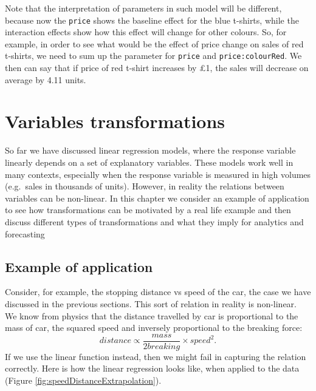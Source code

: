 \documentclass[
]{book}
\theoremstyle{definition}
\theoremstyle{definition}
\theoremstyle{definition}
\theoremstyle{definition}
\theoremstyle{remark}
\begin{document}
Note that the interpretation of parameters in such model will be different, because now the \texttt{price} shows the baseline effect for the blue t-shirts, while the interaction effects show how this effect will change for other colours. So, for example, in order to see what would be the effect of price change on sales of red t-shirts, we need to sum up the parameter for \texttt{price} and \texttt{price:colourRed}. We then can say that if price of red t-shirt increases by £1, the sales will decrease on average by 4.11 units.

\chapter{Variables transformations}\label{variablesTransformations}

So far we have discussed linear regression models, where the response variable linearly depends on a set of explanatory variables. These models work well in many contexts, especially when the response variable is measured in high volumes (e.g.~sales in thousands of units). However, in reality the relations between variables can be non-linear. In this chapter we consider an example of application to see how transformations can be motivated by a real life example and then discuss different types of transformations and what they imply for analytics and forecasting

\section{Example of application}\label{example-of-application}

Consider, for example, the stopping distance vs speed of the car, the case we have discussed in the previous sections. This sort of relation in reality is non-linear. We know from physics that the distance travelled by car is proportional to the mass of car, the squared speed and inversely proportional to the breaking force:
\begin{equation}
    distance \propto \frac{mass}{2 breaking} \times speed^2.
    \label{eq:speedDistanceFormula}
\end{equation}
If we use the linear function instead, then we might fail in capturing the relation correctly. Here is how the linear regression looks like, when applied to the data (Figure \ref{fig:speedDistanceExtrapolation}).
\end{document}
